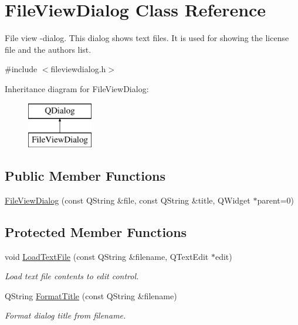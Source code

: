 \hypertarget{class_file_view_dialog}{\section{File\-View\-Dialog Class Reference}
\label{class_file_view_dialog}
}


File view -\/dialog. This dialog shows text files. It is used for showing the license file and the authors list.  




{\ttfamily \#include $<$fileviewdialog.\-h$>$}

Inheritance diagram for File\-View\-Dialog\-:\begin{figure}[H]
\begin{center}
\leavevmode
\includegraphics[height=2.000000cm]{class_file_view_dialog}
\end{center}
\end{figure}
\subsection*{Public Member Functions}
\begin{DoxyCompactItemize}
\item 
\hyperlink{class_file_view_dialog_a1db975397435c663d5e43aa565d82954}{File\-View\-Dialog} (const Q\-String \&file, const Q\-String \&title, Q\-Widget $\ast$parent=0)
\end{DoxyCompactItemize}
\subsection*{Protected Member Functions}
\begin{DoxyCompactItemize}
\item 
void \hyperlink{class_file_view_dialog_ab536a37941859b20ce83408166ff507c}{Load\-Text\-File} (const Q\-String \&filename, Q\-Text\-Edit $\ast$edit)
\begin{DoxyCompactList}\small\item\em Load text file contents to edit control. \end{DoxyCompactList}\item 
Q\-String \hyperlink{class_file_view_dialog_a4f239e2b158b6795747029c41a2055b3}{Format\-Title} (const Q\-String \&filename)
\begin{DoxyCompactList}\small\item\em Format dialog title from filename. \end{DoxyCompactList}\end{DoxyCompactItemize}
